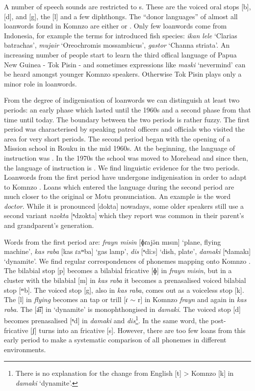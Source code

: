 A number of speech sounds are restricted to s. These are the voiced oral stops [b], [d], and [g], the   [l] and a few diphthongs. The ``donor languages'' of almost all loanwords found in Komnzo are either  or . Only few loanwords come from  Indonesia, for example the terms for introduced fish species: \emph{ikan lele} `Clarias batrachas', \emph{mujair} `Oreochromis mossambicus', \emph{gastor} `Channa striata'. An increasing number of people start to learn the third offical language of Papua New Guinea - Tok Pisin - and sometimes expressions like \emph{maski} `nevermind' can be heard amongst younger Komnzo speakers. Otherwise Tok Pisin plays only a minor role in loanwords.

From the degree of indigenisation of loanwords we can distinguish at least two periods: an early phase which lasted until the 1960s and a second phase from that time until today. The boundary between the two periods is rather fuzzy. The first period was characterised by  speaking patrol officers and officials who visited the area for very short periods. The second period began with the opening of a Mission school in Rouku in the mid 1960s. At the beginning, the language of instruction was . In the 1970s the school was moved to Morehead and since then, the language of instruction is . We find linguistic evidence for the two periods. Loanwords from the first period have undergone indigenisation in order to adapt to Komnzo . Loans which entered the language during the second period are much closer to the original  or Motu pronunciation. An example is the word \emph{doctor}. While it is pronounced [dokta] nowadays, some older speakers still use a second variant \emph{nzokta} [ⁿdzokta] which they report was common in their parent's and grandparent's generation.

Words from the first period are: \emph{frayn misin} [ɸɾajə̆n mısın] `plane, flying machine', \emph{kas raba} [kas ɾaᵐba] `gas lamp', \emph{dis} [ⁿdi:s] `dish, plate', \emph{damaki} [ⁿdamakı] `dynamite'. We find regular correspondences of  phonemes mapping onto Komnzo . The bilabial stop [p] becomes a bilabial fricative [ɸ] in \emph{frayn misin}, but in a cluster with the bilabial  [m] in \emph{kas raba} it becomes a prenasalised voiced bilabial stop [ᵐb]. The  voiced stop [g], also in \emph{kas raba}, comes out as a voiceless  stop [k]. The   [l] in  \emph{flying} becomes an  tap or trill [ɾ $\sim$ r] in Komnzo \emph{frayn} and again in \emph{kas raba}. The   [a͡i] in `dynamite' is monophthongised in \emph{damaki}. The voiced  stop [d] becomes prenasalised [ⁿd] in \emph{damaki} and \emph{dis}\footnote{There is no explanation for the change from English [t] > Komnzo [k] in \emph{damaki} `dynamite'.}. In the same word, the post- fricative [ʃ] turns into an  fricative [s]. However, there are too few loans from this early period to make a systematic comparison of all  phonemes in different environments.

